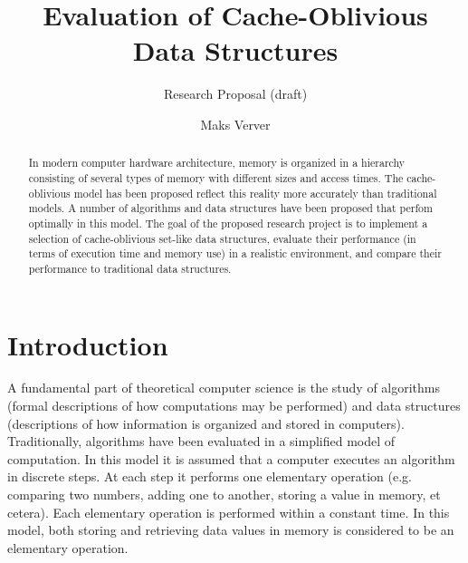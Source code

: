 \documentclass{acm_proc_article-sp}
\begin{document}
\title{Evaluation of Cache-Oblivious Data Structures}
\subtitle{Research Proposal (draft)}

\author{Maks Verver\\ }


\maketitle

\begin{abstract}
In modern computer hardware architecture, memory is organized in a hierarchy consisting of several types of memory with different sizes and access times. The cache-oblivious model has been proposed reflect this reality more accurately than traditional models. A number of algorithms and data structures have been proposed that perfom optimally in this model. The goal of the proposed research project is to implement a selection of cache-oblivious set-like data structures, evaluate their performance (in terms of execution time and memory use) in a realistic environment, and compare their performance to traditional data structures.
\end{abstract}


\section{Introduction}
A fundamental part of theoretical computer science is the study of algorithms (formal descriptions of how computations may be performed) and data structures (descriptions of how information is organized and stored in computers). Traditionally, algorithms have been evaluated in a simplified model of computation. In this model it is assumed that a computer executes an algorithm in discrete steps. At each step it performs one elementary operation (e.g. comparing two numbers, adding one to another, storing a value in memory, et cetera). Each elementary operation is performed within a constant time. In this model, both storing and retrieving data values in memory is considered to be an elementary operation.
\end{document}
